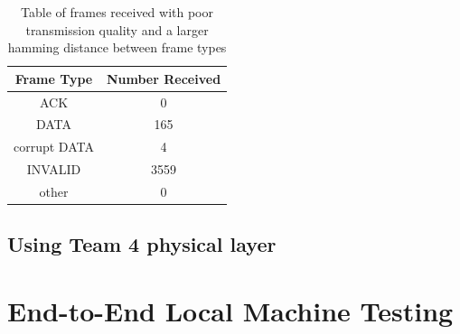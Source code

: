 \begin{table}
	\centering
		\begin{tabular}{| c | c | }
		\hline                       
		Frame Type & Number Received\\
		\hline
			ACK & 0\\
			DATA & 165\\
			corrupt DATA & 4\\
			INVALID & 3559\\
			other & 0\\
		\hline
		\end{tabular}
	\caption{Table of frames received with poor transmission quality and a larger hamming distance between frame types}
	\label{tab:0ACK}
\end{table}
\subsection{Using Team 4 physical layer}
\section{End-to-End Local Machine Testing }

